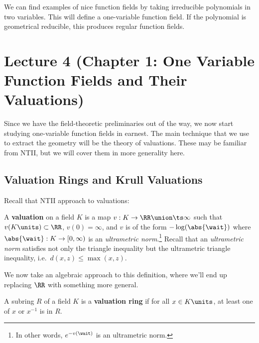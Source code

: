 \begin{remark}

We can find examples of nice function fields by taking irreducible
polynomials in two variables. This will define a one-variable function
field. If the polynomial is geometrical reducible, this produces regular
function fields.

\end{remark}

\hypertarget{lecture-4-chapter-1-one-variable-function-fields-and-their-valuations}{%
\section{Lecture 4 (Chapter 1: One Variable Function Fields and Their
Valuations)}\label{lecture-4-chapter-1-one-variable-function-fields-and-their-valuations}}

Since we have the field-theoretic preliminaries out of the way, we now
start studying one-variable function fields in earnest. The main
technique that we use to extract the geometry will be the theory of
valuations. These may be familiar from NTII, but we will cover them in
more generality here.

\hypertarget{valuation-rings-and-krull-valuations}{%
\subsection{Valuation Rings and Krull
Valuations}\label{valuation-rings-and-krull-valuations}}

Recall that NTII approach to valuations:

\begin{definition}[Valuation]

A \textbf{valuation} on a field \(K\) is a map
\(v:K\to \RR\union \ts\infty\) such that \(v(K\units) \subset \RR\),
\(v(0) = \infty\), and \(v\) is of the form \(-\log(\abs{\wait})\) where
\(\abs{\wait}: K \to [0, \infty)\) is an \emph{ultrametric
norm}.\footnote{In other words, \(e^{-v(\wait)}\) is an ultrametric
  norm.} Recall that an \emph{ultrametric norm} satisfies not only the
triangle inequality but the ultrametric triangle inequality,
i.e.~\(d(x, z) \leq \max(x, z)\).

\end{definition}

We now take an algebraic approach to this definition, where we'll end up
replacing \(\RR\) with something more general.

\begin{definition}

A subring \(R\) of a field \(K\) is a \textbf{valuation ring} if for all
\(x\in K\units\), at least one of \(x\) or \(x^{-1}\) is in \(R\).

\end{definition}

